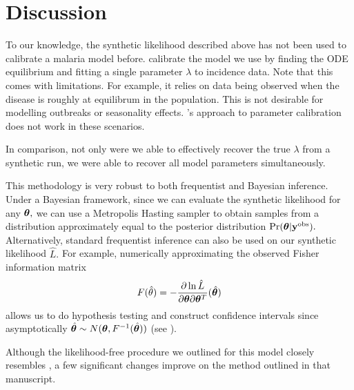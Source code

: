 \chapter{Discussion}

To our knowledge, the synthetic likelihood described above
has not been used to calibrate a malaria model before.
 calibrate the model we use
by finding the ODE equilibrium and fitting a single parameter $\lambda$ to
incidence data. 
Note that this comes with limitations. For example, it relies on data being
observed when the disease is roughly at equilibrum in the population.
This is not desirable for modelling outbreaks or seasonality effects.
's approach to parameter calibration 
does not work in these scenarios.

In comparison, not only were we able to effectively
recover the true $\lambda$ from a synthetic run, we were able to recover
all model parameters simultaneously.

This methodology is very robust to both frequentist and Bayesian inference.
Under a Bayesian framework,
since we can evaluate the synthetic likelihood for any $\bm{\theta},$
we can use a Metropolis Hasting sampler to obtain samples from a distribution
approximately equal to the posterior distribution $\Pr(\bm{\theta} | \mathbf{y}^{\mathrm{obs}}).$
Alternatively, standard frequentist inference can also be used on our
synthetic likelihood $\hat{L}.$ For example, numerically approximating the
observed Fisher information matrix
$$
    F(\hat{\theta})
    = -\frac{\partial \ln\hat{L}}{\partial \bm{\theta}\partial \bm{\theta}^T}(\hat{\bm{\theta}})
$$
allows us to do hypothesis testing and construct confidence intervals
since asymptotically $\hat{\bm{\theta}} \sim N(\bm{\theta}, F^{-1}(\hat{\bm{\theta}}))$
(see \cite{fahrmeir_multivariate_2013}).

Although the likelihood-free procedure we outlined for this model closely
resembles \cite{gutmann_bayesian_2016}, a few significant changes
improve on the method outlined in that manuscript.

